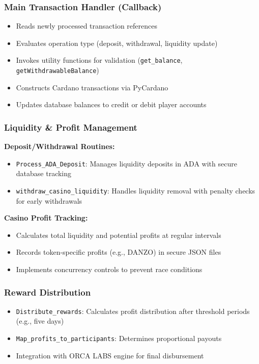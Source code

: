 \documentclass[11pt,a4paper]{article}
\begin{document}
\subsubsection{Main Transaction Handler (Callback)}
\begin{itemize}
    \item Reads newly processed transaction references
    \item Evaluates operation type (deposit, withdrawal, liquidity update)
    \item Invokes utility functions for validation (\texttt{get\_balance}, \texttt{getWithdrawableBalance})
    \item Constructs Cardano transactions via PyCardano
    \item Updates database balances to credit or debit player accounts
\end{itemize}

\subsubsection{Liquidity \& Profit Management}
\textbf{Deposit/Withdrawal Routines:}
\begin{itemize}
    \item \texttt{Process\_ADA\_Deposit}: Manages liquidity deposits in ADA with secure database tracking
    \item \texttt{withdraw\_casino\_liquidity}: Handles liquidity removal with penalty checks for early withdrawals
\end{itemize}

\textbf{Casino Profit Tracking:}
\begin{itemize}
    \item Calculates total liquidity and potential profits at regular intervals
    \item Records token-specific profits (e.g., DANZO) in secure JSON files
    \item Implements concurrency controls to prevent race conditions
\end{itemize}

\subsubsection{Reward Distribution}
\begin{itemize}
    \item \texttt{Distribute\_rewards}: Calculates profit distribution after threshold periods (e.g., five days)
    \item \texttt{Map\_profits\_to\_participants}: Determines proportional payouts
    \item Integration with ORCA LABS engine for final disbursement
\end{itemize}
\end{document}
